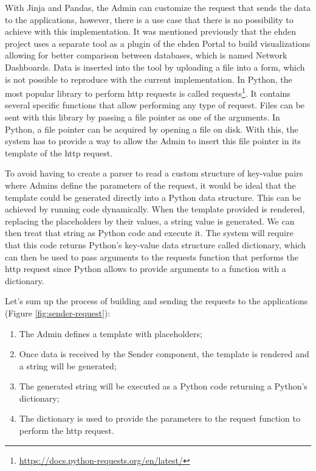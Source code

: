 With Jinja and Pandas, the Admin can customize the request that sends the data to the applications, however, there is a use case that there is no possibility to achieve with this implementation.
It was mentioned previously that the \gls{ehden} project uses a separate tool as a plugin of the \gls{ehden} Portal to build visualizations allowing for better comparison between databases, which is named Network Dashboards.
Data is inserted into the tool by uploading a file into a form, which is not possible to reproduce with the current implementation.
In Python, the most popular library to perform \gls{http} requests is called requests\footnote{\url{https://docs.python-requests.org/en/latest/}}.
It contains several specific functions that allow performing any type of request.
Files can be sent with this library by passing a file pointer as one of the arguments.
In Python, a file pointer can be acquired by opening a file on disk.
With this, the system has to provide a way to allow the Admin to insert this file pointer in its template of the \gls{http} request.

To avoid having to create a parser to read a custom structure of key-value pairs where Admins define the parameters of the request, it would be ideal that the template could be generated directly into a Python data structure.
This can be achieved by running code dynamically.
When the template provided is rendered, replacing the placeholders by their values, a string value is generated.
We can then treat that string as Python code and execute it.
The system will require that this code returns Python's key-value data structure called dictionary, which can then be used to pass arguments to the requests function that performs the \gls{http} request since Python allows to provide arguments to a function with a dictionary.

Let's sum up the process of building and sending the requests to the applications (Figure \ref{fig:sender-request}):
\begin{enumerate}
    \item The Admin defines a template with placeholders;
    \item Once data is received by the Sender component, the template is rendered and a string will be generated;
    \item The generated string will be executed as a Python code returning a Python's dictionary;
    \item The dictionary is used to provide the parameters to the request function to perform the \gls{http} request.
\end{enumerate}

